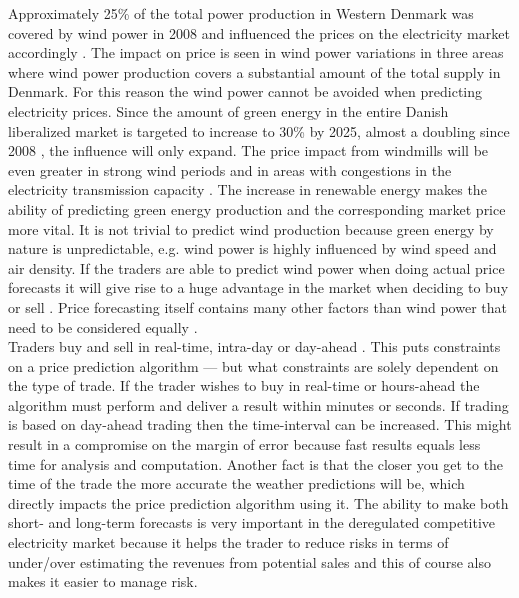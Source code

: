 Approximately 25\% of the total power production in Western Denmark was covered by wind power in 2008 and influenced the prices on the electricity market accordingly \cite{windPowerDanishLiberalized}. The impact on price is seen in wind power variations in three areas where wind power production covers a substantial amount of the total supply in Denmark. For this reason the wind power cannot be avoided when predicting electricity prices\cite{dayAheadImpactOfWindPowerForecasts}. Since the amount of green energy in the entire Danish liberalized market is targeted to increase to 30\% by 2025, almost a doubling since 2008 \cite{windPowerDanishLiberalized}, the influence will only expand. The price impact from windmills will be even greater in strong wind periods and in areas with congestions in the electricity transmission capacity \cite{windPowerDanishLiberalized}. The increase in renewable energy makes the ability of predicting green energy production and the corresponding market price more vital. It is not trivial to predict wind production because green energy by nature is unpredictable, e.g. wind power is highly influenced by wind speed and air density. If the traders are able to predict wind power when doing actual price forecasts it will give rise to a huge advantage in the market when deciding to buy or sell \cite{dayAheadImpactOfWindPowerForecasts}. Price forecasting itself contains many other factors than wind power that need to be considered equally \cite{21}.
\\[0.5cm] Traders buy and sell in real-time, intra-day or day-ahead . This puts constraints on a price prediction algorithm --- but what constraints are solely dependent on the type of trade. If the trader wishes to buy in real-time or hours-ahead the algorithm must perform and deliver a result within minutes or seconds. If trading is based on day-ahead trading then the time-interval can be increased. This might result in a compromise on the margin of error because fast results equals less time for analysis and computation. Another fact is that the closer you get to the time of the trade the more accurate the weather predictions will be, which directly impacts the price prediction algorithm using it. The ability to make both short- and long-term forecasts is very important in the deregulated competitive electricity market because it helps the trader to reduce risks in terms of under/over estimating the revenues from potential sales and this of course also makes it easier to manage risk\cite{21}.
\\[0.5cm]
